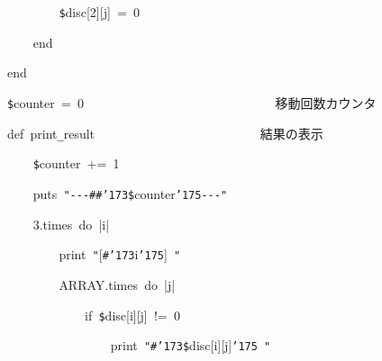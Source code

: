 \documentclass[a4paper,10pt]{article}
\def\mc{\relax}
\begin{document}
\noindent
\mbox{}{\tt\mc \ }{\tt\mc \ }{\tt\mc \ }{\tt\mc \ }{\tt\mc \ }{\tt\mc \ }{\tt\mc \ }{\tt\mc \ }{\tt\$}disc[2][j]{\tt\mc \ }={\tt\mc \ }0

\noindent
\mbox{}{\tt\mc \ }{\tt\mc \ }{\tt\mc \ }{\tt\mc \ }end

\noindent
\mbox{}end

\noindent
\mbox{}\hfill

\noindent
\mbox{}{\tt\$}counter{\tt\mc \ }={\tt\mc \ }0{\tt\mc \ }{\tt\mc \ }{\tt\mc \ }{\tt\mc \ }{\tt\mc \ }{\tt\mc \ }{\tt\mc \ }{\tt\mc \ }{\tt\mc \ }{\tt\mc \ }{\tt\mc \ }{\tt\mc \ }{\tt\mc \ }{\tt\mc \ }{\tt\mc \ }{\tt\mc \ }{\tt\mc \ }{\tt\mc \ }{\tt\mc \ }{\tt\mc \ }{\tt\mc \ }{\tt\mc \ }{\tt\mc \ }{\tt\mc \ }{\tt\mc \ }{\tt\mc \ }{\tt\mc \ }{\tt\mc \ }\rm\mc {\tt\#} \ 移動回数カウンタ \hfill 
\tt\mc 

\noindent
\mbox{}\hfill

\noindent
\mbox{}def{\tt\mc \ }print{\tt\_}result{\tt\mc \ }{\tt\mc \ }{\tt\mc \ }{\tt\mc \ }{\tt\mc \ }{\tt\mc \ }{\tt\mc \ }{\tt\mc \ }{\tt\mc \ }{\tt\mc \ }{\tt\mc \ }{\tt\mc \ }{\tt\mc \ }{\tt\mc \ }{\tt\mc \ }{\tt\mc \ }{\tt\mc \ }{\tt\mc \ }{\tt\mc \ }{\tt\mc \ }{\tt\mc \ }{\tt\mc \ }{\tt\mc \ }{\tt\mc \ }\rm\mc {\tt\#} \ 結果の表示 \hfill 
\tt\mc 

\noindent
\mbox{}{\tt\mc \ }{\tt\mc \ }{\tt\mc \ }{\tt\mc \ }{\tt\$}counter{\tt\mc \ }+={\tt\mc \ }1

\noindent
\mbox{}{\tt\mc \ }{\tt\mc \ }{\tt\mc \ }{\tt\mc \ }puts{\tt\mc \ }{\tt "}{\tt -}{\tt -}{\tt -}{\tt\#}{\tt\#}{\tt\char'173}{\tt\$}counter{\tt\char'175}{\tt -}{\tt -}{\tt -}{\tt "}

\noindent
\mbox{}{\tt\mc \ }{\tt\mc \ }{\tt\mc \ }{\tt\mc \ }3.times{\tt\mc \ }do{\tt\mc \ }|i|

\noindent
\mbox{}{\tt\mc \ }{\tt\mc \ }{\tt\mc \ }{\tt\mc \ }{\tt\mc \ }{\tt\mc \ }{\tt\mc \ }{\tt\mc \ }print{\tt\mc \ }{\tt "}[{\tt\#}{\tt\char'173}i{\tt\char'175}]{\tt\mc \ }{\tt "}

\noindent
\mbox{}{\tt\mc \ }{\tt\mc \ }{\tt\mc \ }{\tt\mc \ }{\tt\mc \ }{\tt\mc \ }{\tt\mc \ }{\tt\mc \ }ARRAY.times{\tt\mc \ }do{\tt\mc \ }|j|

\noindent
\mbox{}{\tt\mc \ }{\tt\mc \ }{\tt\mc \ }{\tt\mc \ }{\tt\mc \ }{\tt\mc \ }{\tt\mc \ }{\tt\mc \ }{\tt\mc \ }{\tt\mc \ }{\tt\mc \ }{\tt\mc \ }if{\tt\mc \ }{\tt\$}disc[i][j]{\tt\mc \ }!={\tt\mc \ }0

\noindent
\mbox{}{\tt\mc \ }{\tt\mc \ }{\tt\mc \ }{\tt\mc \ }{\tt\mc \ }{\tt\mc \ }{\tt\mc \ }{\tt\mc \ }{\tt\mc \ }{\tt\mc \ }{\tt\mc \ }{\tt\mc \ }{\tt\mc \ }{\tt\mc \ }{\tt\mc \ }{\tt\mc \ }print{\tt\mc \ }{\tt "}{\tt\#}{\tt\char'173}{\tt\$}disc[i][j]{\tt\char'175}{\tt\mc \ }{\tt "}
\end{document}
